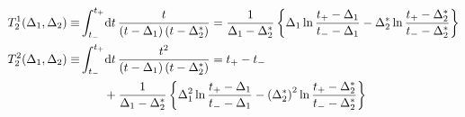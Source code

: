 \documentclass[english,notitlepage]{article}
\begin{document}
\begin{subequations}
\begin{align}
            T_2^1(\Delta_1, \Delta_2) \equiv & \int_{t_-}^{t_+} \!\mathrm{d}t\, \frac{t}{\left(t-\Delta_1\right)\left(t-\Delta_2^\ast\right)} = \frac{1}{\Delta_1 - \Delta_2^\ast} \left\{\Delta_1 \ln\frac{t_+-\Delta_1}{t_--\Delta_1} - \Delta_2^\ast \ln\frac{t_+-\Delta_2^\ast}{t_--\Delta_2^\ast}\right\} \\
            \nonumber
            T_2^2(\Delta_1, \Delta_2) \equiv & \int_{t_-}^{t_+} \!\mathrm{d}t\, \frac{t^2}{\left(t-\Delta_1\right)\left(t-\Delta_2^\ast\right)} = t_+ - t_-                                                                                                                                               \\
                                             & \qquad + \frac{1}{\Delta_1 - \Delta_2^\ast} \left\{\Delta_1^2 \ln\frac{t_+-\Delta_1}{t_--\Delta_1} - \left(\Delta_2^\ast\right)^2 \ln\frac{t_+-\Delta_2^\ast}{t_--\Delta_2^\ast}\right\}
        \end{align}
    \end{subequations}

\end{document}
